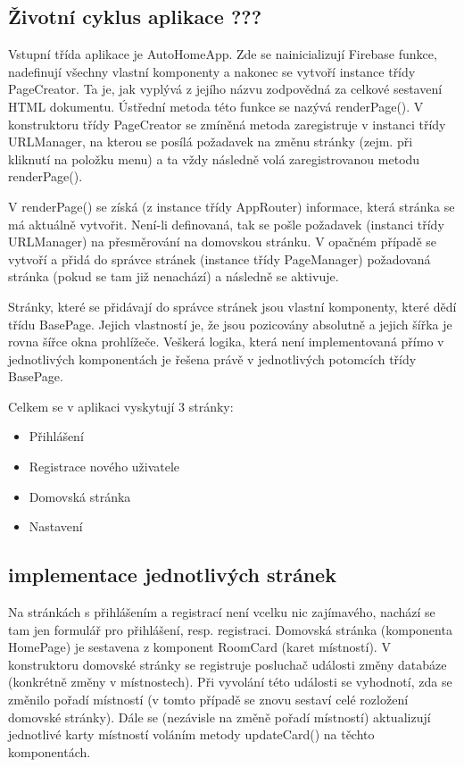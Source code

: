 \subsection*{Životní cyklus aplikace ???}
Vstupní třída aplikace je AutoHomeApp. Zde se nainicializují Firebase funkce, nadefinují všechny vlastní komponenty a nakonec se vytvoří instance třídy PageCreator. Ta je, jak vyplývá z jejího názvu zodpovědná za celkové sestavení HTML dokumentu. Ústřední metoda této funkce se nazývá renderPage(). V konstruktoru třídy PageCreator se zmíněná metoda zaregistruje v instanci třídy URLManager, na kterou se posílá požadavek na změnu stránky (zejm. při kliknutí na položku menu) a ta vždy následně volá zaregistrovanou metodu renderPage().

V renderPage() se získá (z instance třídy AppRouter) informace, která stránka se má aktuálně vytvořit. Není-li definovaná, tak se pošle požadavek (instanci třídy URLManager) na přesměrování na domovskou stránku. V opačném případě se vytvoří a přidá do správce stránek (instance třídy PageManager) požadovaná stránka (pokud se tam již nenachází) a následně se aktivuje. 

Stránky, které se přidávají do správce stránek jsou vlastní komponenty, které dědí třídu BasePage. Jejich vlastností je, že jsou pozicovány absolutně a jejich šířka je rovna šířce okna prohlížeče. Veškerá logika, která není implementovaná přímo v jednotlivých komponentách je řešena právě v jednotlivých potomcích třídy BasePage.

Celkem se v aplikaci vyskytují 3 stránky:
\begin{itemize}
    \item Přihlášení
    \item Registrace nového uživatele
    \item Domovská stránka
    \item Nastavení
\end{itemize}

\subsection*{implementace jednotlivých stránek}
Na stránkách s přihlášením a registrací není vcelku nic zajímavého, nachází se tam jen formulář pro přihlášení, resp. registraci. 
Domovská stránka (komponenta HomePage) je sestavena z komponent RoomCard (karet místností). V konstruktoru domovské stránky se registruje posluchač události změny databáze (konkrétně změny v místnostech). Při vyvolání této události se vyhodnotí, zda se změnilo pořadí místností (v tomto případě se znovu sestaví celé rozložení domovské stránky). Dále se (nezávisle na změně pořadí místností) aktualizují jednotlivé karty místností voláním metody updateCard() na těchto komponentách. 

